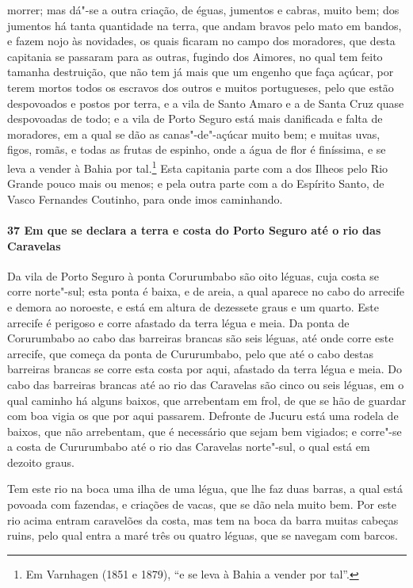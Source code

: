 \begin{linenumbers}
morrer; mas dá"-se a outra criação, de éguas, jumentos e cabras, muito bem; dos jumentos há
tanta quantidade na terra, que andam bravos pelo mato em bandos, e fazem nojo às
novidades, os quais ficaram no campo dos moradores, que desta capitania se passaram para
as outras, fugindo dos Aimores, no qual tem feito tamanha destruição, que não tem já mais
que um engenho que faça açúcar, por terem mortos todos os escravos dos outros e muitos
portugueses, pelo que estão despovoados e postos por terra, e a vila de Santo Amaro e a de
Santa Cruz quase despovoadas de todo; e a vila de Porto Seguro está mais danificada e
falta de moradores, em a qual se dão as canas"-de"-açúcar muito bem; e muitas uvas, figos,
romãs, e todas as frutas de espinho, onde a água de flor é finíssima, e se leva a vender à
Bahia por tal.\footnote{ Em Varnhagen (1851 e 1879), ``e se leva à Bahia a vender por
tal''.} Esta capitania parte com a dos Ilheos pelo Rio Grande pouco mais ou menos; e pela
outra parte com a do Espírito Santo, de Vasco Fernandes Coutinho, para onde imos
caminhando.

\paragraph{37 Em que se declara a terra e costa do Porto Seguro até o rio das Caravelas} \quad
Da vila de Porto Seguro à ponta Corurumbabo são oito léguas, cuja costa se corre
norte"-sul; esta ponta é baixa, e de areia, a qual aparece no cabo do arrecife e demora ao
noroeste, e está em altura de dezessete graus e um quarto. Este arrecife é perigoso e
corre afastado da terra légua e meia. Da ponta de Corurumbabo ao cabo das barreiras
brancas são seis léguas, até onde corre este arrecife, que começa da ponta de Cururumbabo,
pelo que até o cabo destas barreiras brancas se corre esta costa por aqui, afastado da
terra légua e meia. Do cabo das barreiras brancas até ao rio das Caravelas são cinco ou
seis léguas, em o qual caminho há alguns baixos, que arrebentam em frol, de que se hão de
guardar com boa vigia os que por aqui passarem. Defronte de Jucuru está uma rodela de
baixos, que não arrebentam, que é necessário que sejam bem vigiados; e corre"-se a costa de
Cururumbabo até o rio das Caravelas norte"-sul, o qual está em dezoito graus.

Tem este rio na boca uma ilha de uma légua, que lhe faz duas barras, a qual está povoada
com fazendas, e criações de vacas, que se dão nela muito bem. Por este rio acima entram
caravelões da costa, mas tem na boca da barra muitas cabeças ruins, pelo qual entra a maré
três ou quatro léguas, que se navegam com barcos.


\end{linenumbers}
